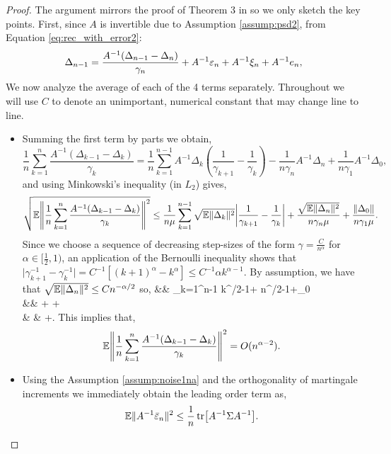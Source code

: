 \begin{proof}
The argument mirrors the proof of Theorem 3 in \citet{moulines2011non} so we only sketch the key points.
First, since $A$ is invertible due to Assumption \ref{assump:psd2}, from Equation \ref{eq:rec_with_error2}:
\[
\Delta_{n-1}= \frac{A^{-1}(\Delta_{n-1}-\Delta_{n})}{\gamma_{n}} + A^{-1}\varepsilon_{n}+A^{-1}\xi_{n}+A^{-1}e_{n},
\]
We now analyze the average of each of the 4 terms separately. Throughout we will use $C$ to denote an unimportant, numerical constant that may change line to line.
\begin{itemize}
\item Summing the first term by parts we obtain,
\[
\frac{1}{n}\sum_{k=1}^n\frac{A^{-1} (\Delta_{k-1}-\Delta_{k})}{\gamma_{k}}=\frac{1}{n}\sum_{k=1}^{n-1}A^{-1}\Delta_k \left(\frac{1}{\gamma_{k+1}}-\frac{1}{\gamma_{k}}\right)-\frac{1}{n\gamma_n}A^{-1}\Delta_n+\frac{1}{n\gamma_1}A^{-1}\Delta_0,
\]
and using Minkowski's inequality (in $L_2$) gives,
\[
\sqrt{\mathbb{E} \norm{ \frac{1}{n}\sum_{k=1}^n\frac{A^{-1}(\Delta_{k-1}-\Delta_{k})}{\gamma_{k}} }^2}  \leq
\frac{1}{n \mu} \sum_{k=1}^{n-1}\sqrt{\mathbb{E} \Vert \Delta_k\Vert^2} \abs{\frac{1}{\gamma_{k+1}}-\frac{1}{\gamma_{k}}} +\frac{\sqrt{\mathbb{E} \Vert \Delta_n\Vert^2}}{n\gamma_n  \mu } +\frac{\Vert \Delta_0 \Vert}{n\gamma_1 \mu}.
\]
Since we choose a sequence of decreasing step-sizes of the form $\gamma=\frac{C}{n^{\alpha}}$ for $\alpha \in [\frac{1}{2}, 1)$, an application of the
Bernoulli inequality shows that $\vert \gamma_{k+1}^{-1}-\gamma_{k}^{-1}\vert = C^{-1} [(k+1)^\alpha-k^\alpha]\leq  C^{-1} \alpha k^{\alpha-1}$. By assumption, we have that
$\sqrt{\mathbb{E} \Vert \Delta_n\Vert^2}\leq Cn^{-\alpha/2}$ so,
\BEAS
{}  &\leq&  \sum_{k=1}^{n-1}  k^{\alpha/2-1}+ n^{\alpha/2-1}+\Vert \Delta_0 \Vert \\
 &\leq& + +\\
 & \leq & +.
\EEAS
This implies that,
\[
\mathbb{E} \norm{ \frac{1}{n}\sum_{k=1}^n\frac{A^{-1}(\Delta_{k-1}-\Delta_{k})}{\gamma_{k}} }^2 = O(n^{\alpha-2}). \]
\item Using the  Assumption  \ref{assump:noise1na} and the orthogonality of martingale increments we immediately obtain the leading order term as,
\[
\mathbb{E} \Vert A^{-1} \bar {\varepsilon}_n\Vert ^2\leq\frac{1}{n}\tr [A^{-1} \Sigma A^{-1}].
\]

\end{itemize}
\end{proof}
